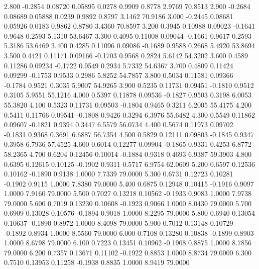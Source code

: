    2.800  -0.2854   0.08720   0.05895   0.0278   0.9909   0.8778   2.9769  70.8513
   2.900  -0.2684   0.08689   0.05888   0.0239   0.9892   0.8797   3.1462  70.9186
   3.000  -0.2445   0.08681   0.05926   0.0183   0.9862   0.8780   3.4360  70.8597
   3.200   0.3945   0.10988   0.09023  -0.1641   0.9648   0.2593   5.1310  53.6467
   3.300   0.4095   0.11008   0.09044  -0.1661   0.9617   0.2593   5.3186  53.6469
   3.400   0.4285   0.11096   0.09086  -0.1689   0.9588   0.2668   5.4920  53.8694
   3.500   0.4421   0.11171   0.09166  -0.1703   0.9568   0.2824   5.6142  54.3202
   3.600   0.4589   0.11286   0.09234  -0.1722   0.9549   0.2934   5.7332  54.6367
   3.700   0.4809   0.11424   0.09299  -0.1753   0.9533   0.2986   5.8252  54.7857
   3.800   0.5034   0.11581   0.09366  -0.1784   0.9521   0.3035   5.9007  54.9265
   3.900   0.5235   0.11731   0.09451  -0.1810   0.9512   0.3105   5.9551  55.1216
   4.000   0.5397   0.11878   0.09536  -0.1827   0.9503   0.3198   6.0053  55.3820
   4.100   0.5323   0.11731   0.09503  -0.1804   0.9465   0.3211   6.2005  55.4175
   4.200   0.5411   0.11766   0.09541  -0.1808   0.9426   0.3294   6.3976  55.6482
   4.300   0.5549   0.11862   0.09607  -0.1821   0.9394   0.3447   6.5579  56.0734
   4.400   0.5674   0.11973   0.09702  -0.1831   0.9368   0.3691   6.6887  56.7354
   4.500   0.5829   0.12111   0.09803  -0.1845   0.9347   0.3958   6.7936  57.4525
   4.600   0.6014   0.12277   0.09904  -0.1865   0.9331   0.4253   6.8772  58.2365
   4.700   0.6204   0.12456   0.10014  -0.1884   0.9318   0.4693   6.9387  59.3903
   4.800   0.6395   0.12615   0.10125  -0.1902   0.9311   0.5717   6.9754  62.0609
   5.200   0.6597   0.12536   0.10162  -0.1890   0.9138   1.0000   7.7339  79.0000
   5.300   0.6731   0.12723   0.10281  -0.1902   0.9115   1.0000   7.8380  79.0000
   5.400   0.6875   0.12948   0.10415  -0.1916   0.9097   1.0000   7.9160  79.0000
   5.500   0.7027   0.13218   0.10562  -0.1933   0.9083   1.0000   7.9738  79.0000
   5.600   0.7019   0.13230   0.10608  -0.1923   0.9066   1.0000   8.0430  79.0000
   5.700   0.6909   0.13028   0.10576  -0.1894   0.9018   1.0000   8.2295  79.0000
   5.800   0.6940   0.13054   0.10637  -0.1890   0.8972   1.0000   8.4098  79.0000
   5.900   0.7012   0.13148   0.10729  -0.1892   0.8934   1.0000   8.5560  79.0000
   6.000   0.7108   0.13280   0.10838  -0.1899   0.8903   1.0000   8.6798  79.0000
   6.100   0.7223   0.13451   0.10962  -0.1908   0.8875   1.0000   8.7856  79.0000
   6.200   0.7357   0.13671   0.11102  -0.1922   0.8853   1.0000   8.8734  79.0000
   6.300   0.7510   0.13953   0.11258  -0.1938   0.8835   1.0000   8.9419  79.0000
